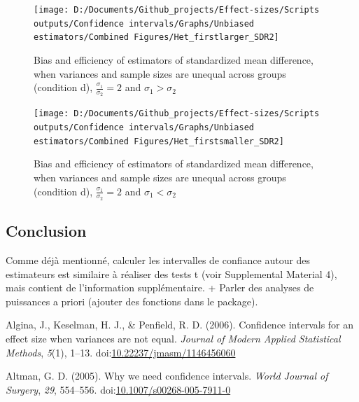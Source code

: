 \documentclass[
  man,floatsintext]{apa6}
\begin{document}
\begin{figure}

{\centering \texttt{[image: D:/Documents/Github\_projects/Effect-sizes/Scripts outputs/Confidence intervals/Graphs/Unbiased estimators/Combined Figures/Het\_firstlarger\_SDR2]} 

}

\caption{Bias and efficiency of estimators of standardized mean difference, when variances and sample sizes are unequal across groups (condition d), $\frac{\sigma_1}{\sigma_2}=2$ and $\sigma_1>\sigma_2$}\label{fig:idHetunbal3bis}
\end{figure}

\begin{figure}

{\centering \texttt{[image: D:/Documents/Github\_projects/Effect-sizes/Scripts outputs/Confidence intervals/Graphs/Unbiased estimators/Combined Figures/Het\_firstsmaller\_SDR2]} 

}

\caption{Bias and efficiency of estimators of standardized mean difference, when variances and sample sizes are unequal across groups (condition d), $\frac{\sigma_1}{\sigma_2}=2$ and $\sigma_1<\sigma_2$}\label{fig:idHetunbal4bis}
\end{figure}

\hypertarget{conclusion}{%
\subsection{Conclusion}\label{conclusion}}

Comme déjà mentionné, calculer les intervalles de confiance autour des estimateurs est similaire à réaliser des tests t (voir Supplemental Material 4), mais contient de l'information supplémentaire.
+ Parler des analyses de puissances a priori (ajouter des fonctions dans le package).

\hypertarget{refs}{}
\leavevmode\hypertarget{ref-Algina_et_al_2006}{}%
Algina, J., Keselman, H. J., \& Penfield, R. D. (2006). Confidence intervals for an effect size when variances are not equal. \emph{Journal of Modern Applied Statistical Methods}, \emph{5}(1), 1--13. doi:\href{https://doi.org/10.22237/jmasm/1146456060}{10.22237/jmasm/1146456060}

\leavevmode\hypertarget{ref-Altman_2005}{}%
Altman, G. D. (2005). Why we need confidence intervals. \emph{World Journal of Surgery}, \emph{29}, 554--556. doi:\href{https://doi.org/10.1007/s00268-005-7911-0}{10.1007/s00268-005-7911-0}
\end{document}
